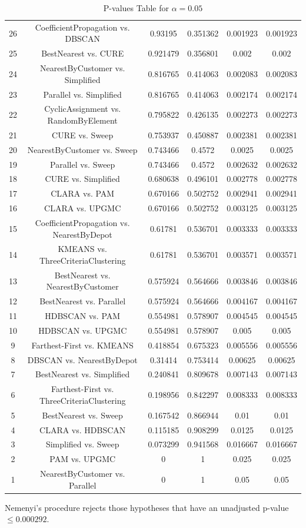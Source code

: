 \documentclass[a4paper,10pt]{article}
\begin{document}
\begin{landscape}
\begin{table}[!htp]
\begin{tabular}{cccccc}
26&CoefficientPropagation vs. DBSCAN&0.93195&0.351362&0.001923&0.001923\\
25&BestNearest vs. CURE&0.921479&0.356801&0.002&0.002\\
24&NearestByCustomer vs. Simplified&0.816765&0.414063&0.002083&0.002083\\
23&Parallel vs. Simplified&0.816765&0.414063&0.002174&0.002174\\
22&CyclicAssignment vs. RandomByElement&0.795822&0.426135&0.002273&0.002273\\
21&CURE vs. Sweep&0.753937&0.450887&0.002381&0.002381\\
20&NearestByCustomer vs. Sweep&0.743466&0.4572&0.0025&0.0025\\
19&Parallel vs. Sweep&0.743466&0.4572&0.002632&0.002632\\
18&CURE vs. Simplified&0.680638&0.496101&0.002778&0.002778\\
17&CLARA vs. PAM&0.670166&0.502752&0.002941&0.002941\\
16&CLARA vs. UPGMC&0.670166&0.502752&0.003125&0.003125\\
15&CoefficientPropagation vs. NearestByDepot&0.61781&0.536701&0.003333&0.003333\\
14&KMEANS vs. ThreeCriteriaClustering&0.61781&0.536701&0.003571&0.003571\\
13&BestNearest vs. NearestByCustomer&0.575924&0.564666&0.003846&0.003846\\
12&BestNearest vs. Parallel&0.575924&0.564666&0.004167&0.004167\\
11&HDBSCAN vs. PAM&0.554981&0.578907&0.004545&0.004545\\
10&HDBSCAN vs. UPGMC&0.554981&0.578907&0.005&0.005\\
9&Farthest-First vs. KMEANS&0.418854&0.675323&0.005556&0.005556\\
8&DBSCAN vs. NearestByDepot&0.31414&0.753414&0.00625&0.00625\\
7&BestNearest vs. Simplified&0.240841&0.809678&0.007143&0.007143\\
6&Farthest-First vs. ThreeCriteriaClustering&0.198956&0.842297&0.008333&0.008333\\
5&BestNearest vs. Sweep&0.167542&0.866944&0.01&0.01\\
4&CLARA vs. HDBSCAN&0.115185&0.908299&0.0125&0.0125\\
3&Simplified vs. Sweep&0.073299&0.941568&0.016667&0.016667\\
2&PAM vs. UPGMC&0&1&0.025&0.025\\
1&NearestByCustomer vs. Parallel&0&1&0.05&0.05\\
\hline
\end{tabular}
\caption{P-values Table for $\alpha=0.05$}
\end{table}Nemenyi's procedure rejects those hypotheses that have an unadjusted p-value $\le0.000292$.


\end{landscape}
\end{document}
